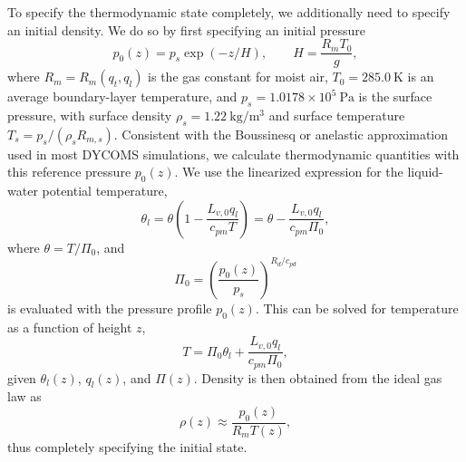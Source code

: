 \documentclass{article}
\begin{document}
{To specify the thermodynamic state completely, we additionally need to specify an initial density. We do so by first specifying an initial pressure
\[
p_0(z) = p_{s} \exp(-z/H), \qquad H = \frac{R_m T_0}{g},
\]
where $R_m = R_m(q_t, q_l)$ is the gas constant for moist air, $T_0 = 285.0~\mathrm{K}$ is an average boundary-layer temperature, and $p_s = 1.0178\times 10^{5}~\mathrm{Pa}$ is the surface pressure, with surface density $\rho_s = 1.22~\mathrm{kg/m^3}$ and surface temperature $T_s = p_s/(\rho_s R_{m,s})$. Consistent with the Boussinesq or anelastic approximation used in most DYCOMS simulations, we calculate thermodynamic quantities with this reference pressure $p_0(z)$. We use the linearized expression for the liquid-water potential temperature,
\begin{equation}
    \label{eq:betts1973}
    \theta_l = \theta \left(1 - \frac{L_{v,0} q_l}{c_{pm} T} \right) = \theta - \frac{L_{v,0} q_l}{c_{pm} \Pi_0},
\end{equation}
where $\theta = T/\Pi_0$, and 
\[
\Pi_0 = \left( \frac{p_0(z)}{p_{s}} \right)^{R_d/c_{pd}}
\]
is evaluated with the pressure profile $p_0(z)$. This can be solved for temperature as a function of height $z$,
\[
T = \Pi_0 \theta_l + \frac{L_{v,0} q_l}{c_{pm} \Pi_0},
\]
given $\theta_l(z)$, $q_l(z)$, and $\Pi(z)$. Density is then obtained from the ideal gas law as
\[
\rho(z) \approx \frac{p_0(z)}{R_m T(z)},
\]
thus completely specifying the initial state. 

}
\end{document}
